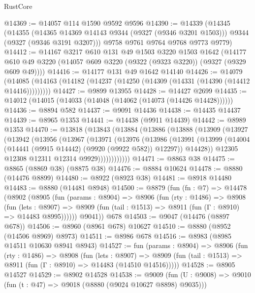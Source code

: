 \begin{lexlean}{RustCore}
\begin{coremodule}
@14369 := @14057 @114 @1590 @9592 @9596
@14390 := @14339
    (@14345
      (@14355
        (@14365 @14369 @14143 @9344 (@9327 (@9346 @3201 @1503)))
        @9344
        (@9327 (@9346 @3191 @3207)))
      @9758
      @9761
      @9764
      @9768
      @9773
      @9779)
@14412 := @14167
    @3217
    @610
    @131
    @49
    @1503
    @3220
    @1503
    @1642
    (@14177 @610 @49 @3220 (@14057 @609 @3220 (@9322 (@9323 @3220)) (@9327 (@9329 @609 @49))))
@14416 := @14177 @131 @49 @1642 @14140
@14426 := @14079
    (@14085 (@14163 (@14182 (@14237 (@14250 (@14309 (@14331 (@14390 (@14412 @14416)))))))))
@14427 := @9899 @13955
@14428 := @14427 @2699
@14435 := @14012 (@14015 (@14033 (@14048 (@14062 (@14073 (@14426 @14428))))))
@14436 := @8894 @582
@14437 := @9091 @14436
@14438 := @14435 @14437
@14439 := @8965 @1353
@14441 := @14438 (@9911 @14439)
@14442 := @8989 @1353
@14470 := @13818
    (@13843
      (@13884
        (@13886
          (@13888
            (@13909
              (@13927
                (@13942
                  (@13956
                    (@13967
                      (@13971
                        (@13976
                          (@13986
                            (@13991
                              (@13999
                                (@14004 (@14441 (@9915 @14442) (@9920 (@9922 @582)) @12297))
                                @14428))
                            @12305
                            @12308
                            @12311
                            @12314
                            @9929))))))))))))
@14471 := @8863 @38
@14475 := @8865 (@8869 @38) (@8875 @38)
@14476 := @8884 @10624
@14478 := @8880 (@14476 @8899)
@14480 := @8922 (@8923 @38)
@14481 := @8918 @14480
@14483 := @8880 (@14481 @8948)
@14500 := @8879
    (fun (fn : @7) =>
    @14478
      (@8902
        (@8905
          (fun (params : @8904) =>
          @8906
            (fun (rty : @1486) =>
            @8908
              (fun (lets : @8907) =>
              @8909 (fun (tail : @1513) => @8911 (fun (Γ : @8910) => @14483 @8995))))))
        @9041))
    @678
@14503 := @9047 (@14476 (@8897 @678))
@14506 := @8960 (@8961 @678) @10627
@14510 := @8880 (@8952 (@14506 @8969) @8973)
@14511 := @8986 @678
@14516 := @8983 (@8985 @14511 @10630 @8941 @8943)
@14527 := fun (params : @8904) =>
  @8906
    (fun (rty : @1486) =>
    @8908
      (fun (lets : @8907) =>
      @8909 (fun (tail : @1513) => @8911 (fun (Γ : @8910) => @14483 (@14510 @14516)))))
@14528 := @8905 @14527
@14529 := @8902 @14528
@14538 := @9009
    (fun (U : @9008) => @9010 (fun (t : @47) => @9018 (@8880 (@9024 @10627 @8898) @9035)))

\end{coremodule}
\end{lexlean}
